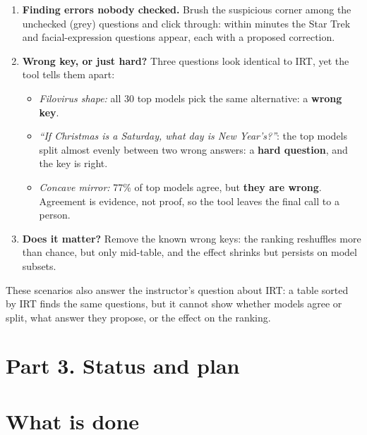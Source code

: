 \documentclass[11pt]{article}
\begin{document}
\begin{enumerate}
  \item \textbf{Finding errors nobody checked.} Brush the suspicious corner among the unchecked (grey)
    questions and click through: within minutes the Star Trek and facial-expression questions appear,
    each with a proposed correction.
  \item \textbf{Wrong key, or just hard?} Three questions look identical to IRT, yet the tool tells
    them apart:
    \begin{itemize}
      \item \emph{Filovirus shape:} all 30 top models pick the same alternative: a \textbf{wrong key}.
      \item \emph{``If Christmas is a Saturday, what day is New Year's?''}: the top models split almost
        evenly between two wrong answers: a \textbf{hard question}, and the key is right.
      \item \emph{Concave mirror:} 77\% of top models agree, but \textbf{they are wrong}. Agreement is
        evidence, not proof, so the tool leaves the final call to a person.
    \end{itemize}
  \item \textbf{Does it matter?} Remove the known wrong keys: the ranking reshuffles more than chance,
    but only mid-table, and the effect shrinks but persists on model subsets.
\end{enumerate}

These scenarios also answer the instructor's question about IRT: a table sorted by IRT finds the same
questions, but it cannot show whether models agree or split, what answer they propose, or the
effect on the ranking.

\section*{Part 3. Status and plan}

\section{What is done}
\end{document}
